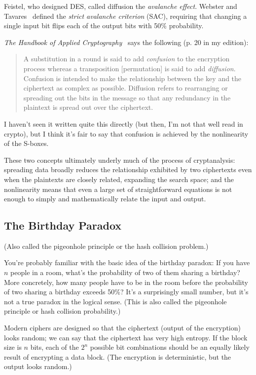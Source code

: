 Feistel, who designed DES, called diffusion the \emph{avalanche
  effect}.  Webster and Tavares~\cite{webster86:avalanche} defined the
\emph{strict avalanche criterion} (SAC), requiring that changing a
single input bit flips each of the output bits with 50\% probability.

\emph{The Handbook of Applied Cryptography}~\cite{menezes1996handbook}
says the following (p. 20 in my edition):

\begin{quote}
A substitution in a round is said to add \emph{confusion} to the
encryption process whereas a transposition [permutation] is said to
add \emph{diffusion}. Confusion is intended to make the relationship
between the key and the ciphertext as complex as possible.  Diffusion
refers to rearranging or spreading out the bits in the message so that
any redundancy in the plaintext is spread out over the ciphertext.
\end{quote}

\aono{}
I haven't seen it written quite this directly (but then, I'm not that
well read in crypto), but I think it's fair to say that confusion is
achieved by the nonlinearity of the S-boxes.

These two concepts ultimately underly much of the process of
cryptanalysis: spreading data broadly reduces the relationship
exhibited by two ciphertexts even when the plaintexts are closely
related, expanding the search space; and the nonlinearity means that
even a large set of straightforward equations is not enough to simply
and mathematically relate the input and output.

\subsection{The Birthday Paradox}
\label{sec: birthday}

(Also called the pigeonhole principle or the hash collision problem.)

You're probably familiar with the basic idea of the birthday paradox:
If you have $n$ people in a room, what's the probability of two of
them sharing a birthday?  More concretely, how many people have to be
in the room before the probability of two sharing a birthday exceeds
50\%?  It's a surprisingly small number, but it's not a true paradox in
the logical sense.  (This is also called the pigeonhole principle or
hash collision probability.)

Modern ciphers are designed so that the ciphertext (output of the
encryption) looks random; we can say that the ciphertext has very high
entropy.  If the block size is $n$ bits, each of the $2^n$ possible
bit combinations should be an equally likely result of encrypting a
data block.  (The encryption is deterministic, but the output looks
random.)

